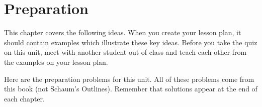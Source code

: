 \section{Preparation}

This chapter covers the following ideas. When you create your lesson plan, it should contain examples which illustrate these key ideas. Before you take the quiz on this unit, meet with another student out of class and teach each other from the examples on your lesson plan. 



Here are the preparation problems for this unit.  All of these problems come from this book (not Schaum's Outlines).  Remember that solutions appear at the end of each chapter.



